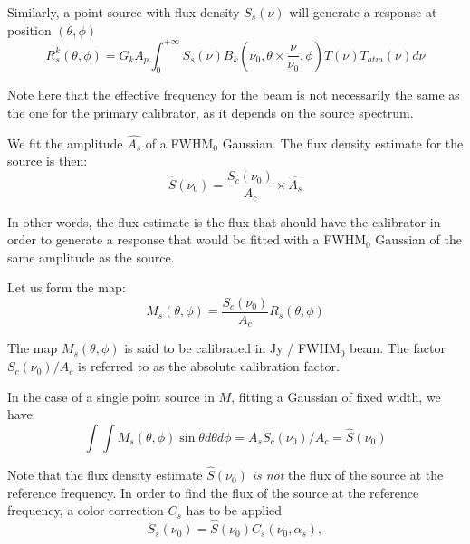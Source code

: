 Similarly, a point source with flux density $S_{s}(\nu)$ will
generate a response at position $(\theta, \phi)$
\begin{equation}
R_{s}^{k}(\theta, \phi) =  G_{k} A_{p}  \int_{0}^{+\infty}
S_{s}(\nu) B_{k}(\nu_{0}, \theta \times \frac{\nu}{\nu_{0}},
\phi) T(\nu) T_{atm}(\nu) d\nu
\label{eq:pointsourceresponse}
\end{equation}

Note here that the effective frequency for the beam is not necessarily
the same as the one for the primary calibrator, as it depends on the
source spectrum.

We fit the amplitude $\hat{A_{s}}$ of a FWHM$_0$ Gaussian.
The flux density estimate for the source is then:
\begin{equation}
\hat{S}(\nu_{0})  = \frac{S_{c}(\nu_{0})}{A_{c}} \times \hat{A_{s}}
\label{eq:pointsourcephot}
\end{equation}


In other words, the flux estimate is the flux that should have the
calibrator in order to generate a response that would be fitted with a FWHM$_0$
Gaussian of the same amplitude as the source.

Let us form the map:
\begin{equation}
M_{s}(\theta, \phi) = \frac{S_{c} (\nu_{0})}{A_{c}}  R_{s}(\theta,
\phi)
\label{eq:pointsourcemap}
\end{equation}

The map $M_{s}(\theta, \phi)$ is said to be calibrated in Jy / FWHM$_{0}$
beam. The factor $S_{c} (\nu_{0})/A_{c}$ is referred to as the
absolute calibration factor.

In the case of a single point source in $M$, fitting a Gaussian of fixed
width, we have:
\begin{equation}
\int \int M_{s}(\theta, \phi) \sin \theta d\theta d\phi = \hat{A_{s}}  S_{c} (\nu_{0}) /
A_{c} = \hat{S}(\nu_{0})
\end{equation}

Note that the flux density estimate $\hat{S}(\nu_{0})$ {\em is not} the flux of the source at the
reference frequency. In order to find the flux of the source at the
reference frequency, a color correction $C_{s}$ has to be applied
\begin{equation}
S_{s}(\nu_{0}) = \hat{S}(\nu_{0})  C_{s}(\nu_{0}, \alpha_s),
\end{equation}


